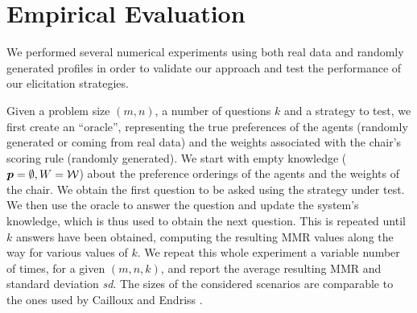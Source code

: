 \documentclass[runningheads]{llncs}
\theoremstyle{remark}
\begin{document}

\section{Empirical Evaluation} 
\label{sec:experiments}
We  performed several numerical experiments using both real data and randomly generated profiles in order to validate our approach and test the performance of our elicitation strategies. %

Given a problem size $(m, n)$, a number of questions $k$ and a strategy to test, we first create an “oracle”, representing the true preferences of the agents (randomly generated or coming from real data) and the weights associated with the chair’s scoring rule (randomly generated).
We start with empty knowledge (${\bm{p}} = \emptyset, W = \mathcal{W}$) about the preference orderings of the agents and the weights %
of the chair. We obtain the first question to be asked using the strategy under test. We then use the oracle to answer the question and update the system's knowledge, which is thus used to obtain the next question. This is repeated until $k$ answers have been obtained, computing the resulting MMR values along the way for various values of $k$. We repeat this whole experiment a variable number of times, for a given $(m, n, k)$, and report the average resulting MMR and standard deviation \textit{sd}. The sizes of the considered scenarios are comparable to the ones used by Cailloux and Endriss \cite{Cailloux2014}. 
\end{document}
